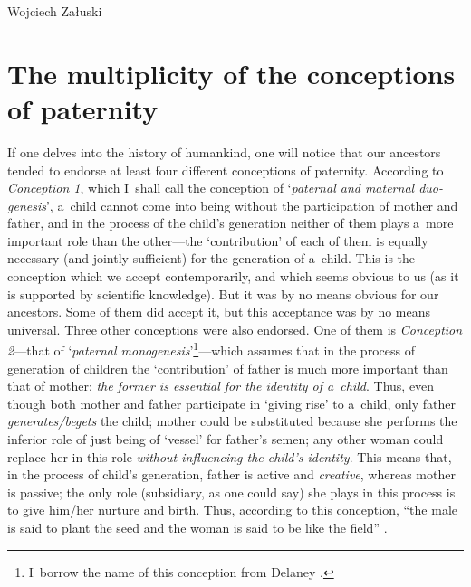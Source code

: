 \begin{artengenv}{Wojciech Załuski}
\section{The multiplicity of the conceptions of paternity}\label{zal:sec2}
If one delves into the history of humankind, one will notice that our ancestors tended to endorse at least four different conceptions of paternity. According to \textit{Conception 1}, which I~shall call the conception of ‘\textit{paternal and maternal duo-genesis}', a~child cannot come into being without the participation of mother and father, and in the process of the child's generation neither of them plays a~more important role than the other---the ‘contribution' of each of them is equally necessary (and jointly sufficient) for the generation of a~child. This is the conception which we accept contemporarily, and which seems obvious to us (as it is supported by scientific knowledge). But it was by no means obvious for our ancestors. Some of them did accept it, but this acceptance was by no means universal. Three other conceptions were also endorsed. One of them is \textit{Conception 2}---that of ‘\textit{paternal monogenesis}'\footnote{I~borrow the name of this conception from Delaney
\parencite*[][]{delaney_meaning_1986}.%
}---which assumes that in the process of generation of children the ‘contribution' of father is much more important than that of mother: \textit{the former is essential for the identity of a~child}. Thus, even though both mother and father participate in ‘giving rise' to a~child, only father \textit{generates/begets} the child; mother could be substituted because she performs the inferior role of just being of ‘vessel' for father's semen; any other woman could replace her in this role \textit{without influencing the child's identity}. This means that, in the process of child's generation, father is active and \textit{creative}, whereas mother is passive; the only role (subsidiary, as one could say) she plays in this process is to give him/her nurture and birth. Thus, according to this conception, ``the male is said to plant the seed and the woman is said to be like the field'' 
\parencite[][p.495]{delaney_meaning_1986}. %

\end{artengenv}
